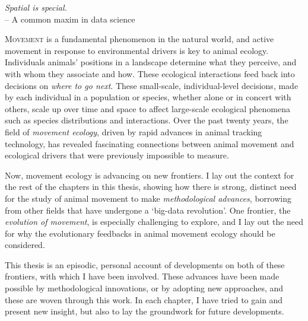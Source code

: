 \label{ch:abstract}

\begin{center}
    \emph{Spatial is special.}\\
    \medskip
    -- \small{A common maxim in data science}
\end{center}

\lettrine{M}{ovement} is a fundamental phenomenon in the natural world, and active movement in response to environmental drivers is key to animal ecology.
Individuals animals' positions in a landscape determine what they perceive, and with whom they associate and how.
These ecological interactions feed back into decisions on \textit{where to go next}.
These small-scale, individual-level decisions, made by each individual in a population or species, whether alone or in concert with others, scale up over time and space to affect large-scale ecological phenomena such as species distributions and interactions.
Over the past twenty years, the field of \textit{movement ecology}, driven by rapid advances in animal tracking technology, has revealed fascinating connections between animal movement and ecological drivers that were previously impossible to measure.

\medskip

\noindent Now, movement ecology is advancing on new frontiers.%
I lay out the context for the rest of the chapters in this thesis, showing how there is strong, distinct need for the study of animal movement to make \textit{methodological advances}, borrowing from other fields that have undergone a `big-data revolution'.
One frontier, the \textit{evolution of movement}, is especially challenging to explore, and I lay out the need for why the evolutionary feedbacks in animal movement ecology should be considered.

\medskip

\noindent This thesis is an episodic, personal account of developments on both of these frontiers, with which I have been involved.
These advances have been made possible by methodological innovations, or by adopting new approaches, and these are woven through this work. 
In each chapter, I have tried to gain and present new insight, but also to lay the groundwork for future developments.

